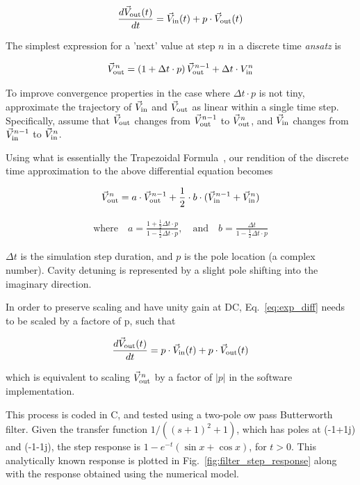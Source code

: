 \documentclass[a4paper,12pt]{article}
\begin{document}
\begin{appendix}
\begin{equation}
 \frac{d\vec V_{\rm out}(t)}{dt} = \vec V_{\rm in}(t) + p\cdot \vec V_{\rm out}(t)
\label{eq:exp_diff}
\end{equation}

The simplest expression for a 'next' value at step $n$ in a discrete time \emph{ansatz} is

\begin{equation}
 \vec V_{\rm out}^n = \left( 1 + \Delta t \cdot p\right) \vec V_{\rm out}^{n-1} + \Delta t \cdot V_{\rm in}^n
\end{equation}

\noindent To improve convergence properties in the case where $\Delta t \cdot p$ is not tiny, approximate the trajectory of $\vec V_{\rm in}$ and $\vec V_{\rm out}$ as linear within a single time step. Specifically, assume that $\vec V_{\rm out}$ changes from $\vec V_{\rm out}^{n-1}$ to $\vec V_{\rm out}^n$, and $\vec V_{\rm in}$ changes from $\vec V_{\rm in}^{n-1}$ to $\vec V_{\rm in}^n$.

Using what is essentially the Trapezoidal Formula~\cite{ref:trapezoid}, our rendition of the discrete time approximation to the above differential equation becomes

\begin{equation} \label{eq:approx}
 	\vec V_{\rm out}^n=a \cdot \vec V_{\rm out}^{n-1}+\frac{1}{2}\cdot b \cdot (\vec V_{\rm in}^{n-1}+\vec V_{\rm in}^n)
\end{equation}

\begin{eqnarray}
	\nonumber \mbox{where} \quad a=\frac{1+ \frac{1}{2} \Delta t \cdot p}{1-\frac{1}{2}\Delta t \cdot p}, \quad \mbox{and} \quad b=\frac{\Delta t}{1-\frac{1}{2}\Delta t \cdot p}
\end{eqnarray}

\noindent $\Delta t$ is the simulation step duration, and $p$ is the pole location (a complex number). Cavity detuning is represented by a slight pole shifting into the imaginary direction.

In order to preserve scaling and have unity gain at DC, Eq.~\ref{eq:exp_diff} needs to be scaled by a factore of p, such that

\begin{equation}
 \frac{d\vec V_{\rm out}(t)}{dt} = p \cdot \vec V_{\rm in}(t) + p\cdot \vec V_{\rm out}(t)
\label{eq:exp_diff2}
\end{equation}

\noindent which is equivalent to scaling $\vec V_{\rm out}^n$ by a factor of $|p|$ in the software implementation.

This process is coded in C, and tested using a two-pole ow pass Butterworth filter. Given the transfer function $1/((s+1)^2+1)$, which has poles at (-1+1j) and (-1-1j), 
the step response is $1 - e^{-t} (\sin x + \cos x)$, for $t > 0$. This analytically known response is plotted in Fig.~\ref{fig:filter_step_response} along with the response obtained using the numerical model.


\end{appendix}
\end{document}
